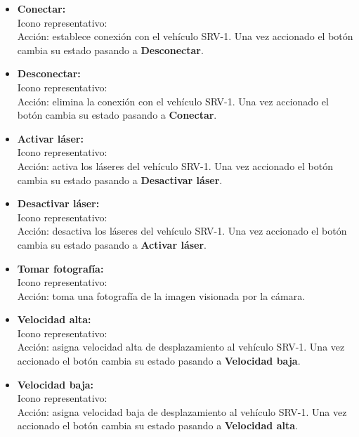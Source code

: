 \begin{itemize}
\item \textbf{Conectar:}\\
Icono representativo:\quad  {} \\
Acción: establece conexión con el vehículo SRV-1. Una vez accionado el botón cambia su estado pasando a \textbf{Desconectar}.

\item \textbf{Desconectar:}\\
Icono representativo:\quad  {} \\
Acción: elimina la conexión con el vehículo SRV-1. Una vez accionado el botón cambia su estado pasando a \textbf{Conectar}.

\item \textbf{Activar láser:} \\
Icono representativo:\quad  {} \\
Acción: activa los láseres del vehículo SRV-1. Una vez accionado el botón cambia su estado pasando a \textbf{Desactivar láser}.

\item \textbf{Desactivar láser:}\\
Icono representativo:\quad  {} \\
Acción: desactiva los láseres del vehículo SRV-1. Una vez accionado el botón cambia su estado pasando a \textbf{Activar láser}.

\item \textbf{Tomar fotografía:}\\
 Icono representativo:\quad  {} \\
Acción: toma una fotografía de la imagen visionada por la cámara.

\item \textbf{Velocidad alta:}\\
 Icono representativo:\quad  {} \\
Acción: asigna velocidad alta de desplazamiento al vehículo SRV-1. Una vez accionado el botón cambia su estado pasando a \textbf{Velocidad baja}.

\item \textbf{Velocidad baja:}\\
Icono representativo:\quad  {} \\
Acción: asigna velocidad baja de desplazamiento al vehículo SRV-1. Una vez accionado el botón cambia su estado pasando a \textbf{Velocidad alta}.



\end{itemize}
